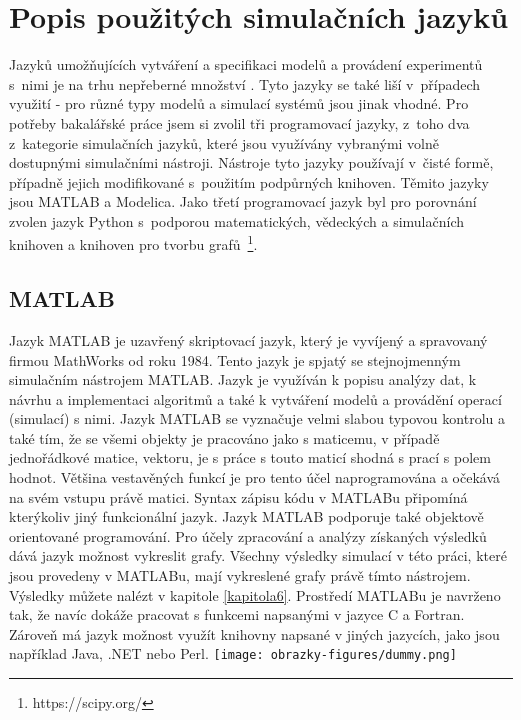 \section{Popis použitých simulačních jazyků}

Jazyků umožňujících vytváření a specifikaci modelů a provádení experimentů s~nimi je na trhu nepřeberné množství \cite{list-of-process-modelling-lang}. Tyto jazyky se také liší v~případech využití - pro různé typy modelů a simulací systémů jsou jinak vhodné. Pro potřeby bakalářské práce jsem si zvolil tři programovací jazyky, z~toho dva z~kategorie simulačních jazyků, které jsou využívány vybranými volně dostupnými simulačními nástroji. Nástroje tyto jazyky používají v~čisté formě, případně jejich modifikované s~použitím podpůrných knihoven. Těmito jazyky jsou MATLAB a Modelica. Jako třetí programovací jazyk byl pro porovnání zvolen jazyk Python s~podporou matematických, vědeckých a simulačních knihoven a knihoven pro tvorbu grafů~\footnote{https://scipy.org/}.

\subsection{MATLAB}
Jazyk MATLAB je uzavřený skriptovací jazyk, který je vyvíjený a spravovaný firmou MathWorks od roku 1984. Tento jazyk je spjatý se stejnojmenným simulačním nástrojem MATLAB. Jazyk je využíván k popisu analýzy dat, k návrhu a implementaci algoritmů a také k vytváření modelů a provádění operací (simulací) s nimi. Jazyk MATLAB se vyznačuje velmi slabou typovou kontrolu a také tím, že se všemi objekty je pracováno jako s maticemu, v případě jednořádkové matice, vektoru, je s práce s touto maticí shodná s prací s polem hodnot. Většina vestavěných funkcí je pro tento účel naprogramována a očekává na svém vstupu právě matici. Syntax zápisu kódu v MATLABu připomíná kterýkoliv jiný funkcionální jazyk. Jazyk MATLAB podporuje také objektově orientované programování. Pro účely zpracování a analýzy získaných výsledků dává jazyk možnost vykreslit grafy. Všechny výsledky simulací v této práci, které jsou provedeny v MATLABu, mají vykreslené grafy právě tímto nástrojem. Výsledky můžete nalézt v kapitole \ref{kapitola6}. Prostředí MATLABu je navrženo tak, že navíc dokáže pracovat s funkcemi napsanými v jazyce C a Fortran. Zároveň má jazyk možnost využít knihovny napsané v jiných jazycích, jako jsou například Java, .NET nebo Perl.
\texttt{[image: obrazky-figures/dummy.png]}

